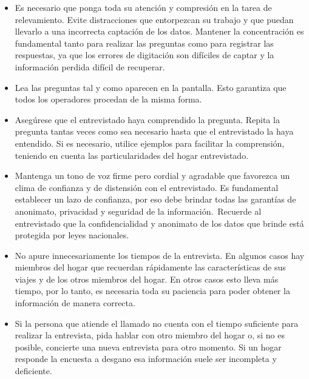 \documentclass[
  openany]{book}
\begin{document}
\begin{itemize}
\item
  Es necesario que ponga toda su atención y compresión en la tarea de relevamiento. Evite distracciones que entorpezcan su trabajo y que puedan llevarlo a una incorrecta captación de los datos. Mantener la concentración es fundamental tanto para realizar las preguntas como para registrar las respuestas, ya que los errores de digitación son difíciles de captar y la información perdida difícil de recuperar.
\item
  Lea las preguntas tal y como aparecen en la pantalla. Esto garantiza que todos los operadores procedan de la misma forma.
\item
  Asegúrese que el entrevistado haya comprendido la pregunta. Repita la pregunta tantas veces como sea necesario hasta que el entrevistado la haya entendido. Si es necesario, utilice ejemplos para facilitar la comprensión, teniendo en cuenta las particularidades del hogar entrevistado.
\item
  Mantenga un tono de voz firme pero cordial y agradable que favorezca un clima de confianza y de distensión con el entrevistado. Es fundamental establecer un lazo de confianza, por eso debe brindar todas las garantías de anonimato, privacidad y seguridad de la información.~Recuerde al entrevistado que la confidencialidad y anonimato de los datos que brinde está protegida por leyes nacionales.
\item
  No apure innecesariamente los tiempos de la entrevista. En algunos casos hay miembros del hogar que recuerdan rápidamente las características de sus viajes y de los otros miembros del hogar. En otros casos esto lleva más tiempo, por lo tanto, es necesaria toda su paciencia para poder obtener la información de manera correcta.
\item
  Si la persona que atiende el llamado no cuenta con el tiempo suficiente para realizar la entrevista, pida hablar con otro miembro del hogar o, si no es posible, concierte una nueva entrevista para otro momento. Si un hogar responde la encuesta a desgano esa información suele ser incompleta y deficiente.
\end{itemize}
\end{document}
